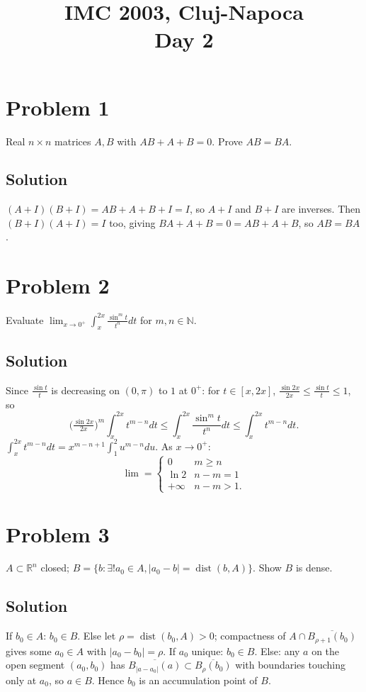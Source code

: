 \documentclass{article}
\title{IMC 2003, Cluj-Napoca \\ Day 2}
\date{}
\begin{document}
\maketitle

\section*{Problem 1}
Real $n \times n$ matrices $A, B$ with $AB + A + B = 0$. Prove $AB = BA$.

\subsection*{Solution}
$(A + I)(B + I) = AB + A + B + I = I$, so $A + I$ and $B + I$ are inverses. Then $(B + I)(A + I) = I$ too, giving $BA + A + B = 0 = AB + A + B$, so $AB = BA$.

\section*{Problem 2}
Evaluate $\displaystyle \lim_{x \to 0^+} \int_x^{2x} \frac{\sin^m t}{t^n} dt$ for $m, n \in \mathbb{N}$.

\subsection*{Solution}
Since $\tfrac{\sin t}{t}$ is decreasing on $(0, \pi)$ to $1$ at $0^+$: for $t \in [x, 2x]$, $\tfrac{\sin 2x}{2x} \le \tfrac{\sin t}{t} \le 1$, so
\[
\bigl(\tfrac{\sin 2x}{2x}\bigr)^m \int_x^{2x} t^{m - n} dt \le \int_x^{2x} \frac{\sin^m t}{t^n} dt \le \int_x^{2x} t^{m - n} dt.
\]
$\int_x^{2x} t^{m-n} dt = x^{m - n + 1} \int_1^2 u^{m - n} du$. As $x \to 0^+$:
\[
\lim = \begin{cases} 0 & m \ge n \\ \ln 2 & n - m = 1 \\ +\infty & n - m > 1. \end{cases}
\]

\section*{Problem 3}
$A \subset \mathbb{R}^n$ closed; $B = \{b : \exists ! a_0 \in A, |a_0 - b| = \operatorname{dist}(b, A)\}$. Show $B$ is dense.

\subsection*{Solution}
If $b_0 \in A$: $b_0 \in B$. Else let $\rho = \operatorname{dist}(b_0, A) > 0$; compactness of $A \cap \overline{B_{\rho + 1}(b_0)}$ gives some $a_0 \in A$ with $|a_0 - b_0| = \rho$. If $a_0$ unique: $b_0 \in B$. Else: any $a$ on the open segment $(a_0, b_0)$ has $\overline{B_{|a - a_0|}(a)} \subset \overline{B_\rho(b_0)}$ with boundaries touching only at $a_0$, so $a \in B$. Hence $b_0$ is an accumulation point of $B$.
\end{document}

